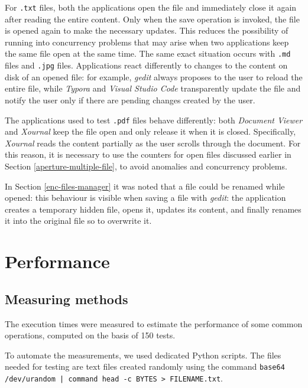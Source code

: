 \documentclass[a4paper,12pt,twoside,openright]{report}
\begin{document}
  For \texttt{.txt} files, both the applications open
  the file and immediately close it again after reading the entire content.
  Only when the save operation is invoked, the file is opened again to make the necessary updates.
  This reduces the possibility of running into concurrency problems that may arise
  when two applications keep the same file open at the same time.
  The same exact situation occurs with \texttt{.md} files and \texttt{.jpg} files.
  Applications react differently to changes to the content on disk of an opened file:
  for example, \textit{gedit} always proposes to the user to reload the entire file,
  while \textit{Typora} and \textit{Visual Studio Code} transparently update the file and notify
  the user only if there are pending changes created by the user.
  
  The applications used to test \texttt{.pdf} files behave differently:
  both \textit{Document Viewer} and \textit{Xournal} keep the file open and only release it when it is closed.
  Specifically, \textit{Xournal} reads the content partially as the user scrolls through the document.
  For this reason, it is necessary to use the counters for open files discussed earlier in Section \ref{aperture-multiple-file},
  to avoid anomalies and concurrency problems.

  In Section \ref{enc-files-manager} it was noted that a file could be renamed while opened:
  this behaviour is visible when saving a file with \textit{gedit}: the application creates a temporary
  hidden file, opens it, updates its content, and finally renames it into the original file so to overwrite it.

  \section{Performance}

  \subsection{Measuring methods}

  The execution times were measured to estimate the performance of some common operations, computed on the basis of 150 tests.

  To automate the measurements, we used dedicated Python scripts.
  The files needed for testing are text files created randomly using
  the command \texttt{base64 /dev/urandom | command head -c BYTES > FILENAME.txt}.
\end{document}
